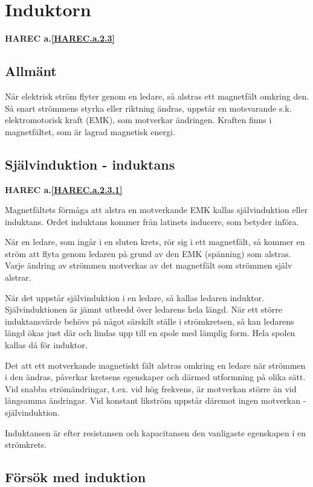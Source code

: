 \section{Induktorn}
\textbf{HAREC a.\ref{HAREC.a.2.3}\label{myHAREC.a.2.3}}

\subsection{Allmänt}

När elektrisk ström flyter genom en ledare, så alstras ett magnetfält omkring
den. Så snart strömmens styrka eller riktning ändras, uppstår en motsvarande
s.k. elektromotorisk kraft (EMK), som motverkar ändringen. Kraften finns i
magnetfältet, som är lagrad magnetisk energi.


\subsection{Självinduktion - induktans}
\textbf{HAREC a.\ref{HAREC.a.2.3.1}\label{myHAREC.a.2.3.1}}

Magnetfältets förmåga att alstra en motverkande EMK kallas självinduktion eller
induktans. Ordet induktans kommer från latinets inducere, som betyder införa.

När en ledare, som ingår i en sluten krets, rör sig i ett magnetfält, så kommer
en ström att flyta genom ledaren på grund av den EMK (spänning) som alstras.
Varje ändring av strömmen motverkas av det magnetfält som strömmen själv
alstrar.

När det uppstår självinduktion i en ledare, så kallas ledaren induktor.
Självinduktionen är jämnt utbredd över ledarens hela längd. När ett större
induktansvärde behövs på något särskilt ställe i strömkretsen, så kan ledarens
längd ökas just där och lindas upp till en spole med lämplig form.
Hela spolen kallas då för induktor.

Det att ett motverkande magnetiskt fält alstras omkring en ledare när strömmen i
den ändras, påverkar kretsens egenskaper och därmed utformning på olika sätt.
Vid snabba strömändringar, t.ex. vid hög frekvens, är motverkan större än vid
långsamma ändringar. Vid konstant likström uppstår däremot ingen motverkan -
självinduktion.

Induktansen är efter resistansen och kapacitansen den vanligaste egenskapen i
en strömkrets.

\subsection{Försök med induktion}

